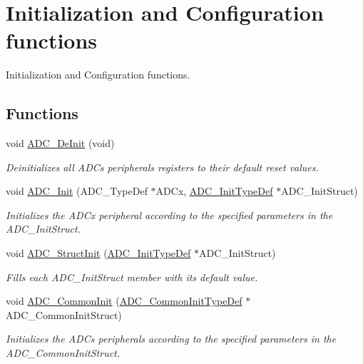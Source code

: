 \hypertarget{group___a_d_c___group1}{\section{Initialization and Configuration functions}
\label{group___a_d_c___group1}
}


Initialization and Configuration functions.  


\subsection*{Functions}
\begin{DoxyCompactItemize}
\item 
void \hyperlink{group___a_d_c___group1_ga1962afdd9eebe5c896bbba2e4f26fe09}{A\-D\-C\-\_\-\-De\-Init} (void)
\begin{DoxyCompactList}\small\item\em Deinitializes all A\-D\-Cs peripherals registers to their default reset values. \end{DoxyCompactList}\item 
void \hyperlink{group___a_d_c___group1_gabbab6038cf8691404350625e477254f9}{A\-D\-C\-\_\-\-Init} (A\-D\-C\-\_\-\-Type\-Def $\ast$A\-D\-Cx, \hyperlink{struct_a_d_c___init_type_def}{A\-D\-C\-\_\-\-Init\-Type\-Def} $\ast$A\-D\-C\-\_\-\-Init\-Struct)
\begin{DoxyCompactList}\small\item\em Initializes the A\-D\-Cx peripheral according to the specified parameters in the A\-D\-C\-\_\-\-Init\-Struct. \end{DoxyCompactList}\item 
void \hyperlink{group___a_d_c___group1_ga6c6e754d1d0a98d56e465efaf73272ec}{A\-D\-C\-\_\-\-Struct\-Init} (\hyperlink{struct_a_d_c___init_type_def}{A\-D\-C\-\_\-\-Init\-Type\-Def} $\ast$A\-D\-C\-\_\-\-Init\-Struct)
\begin{DoxyCompactList}\small\item\em Fills each A\-D\-C\-\_\-\-Init\-Struct member with its default value. \end{DoxyCompactList}\item 
void \hyperlink{group___a_d_c___group1_ga5803f6581a9cd7e90b6e637067102d94}{A\-D\-C\-\_\-\-Common\-Init} (\hyperlink{struct_a_d_c___common_init_type_def}{A\-D\-C\-\_\-\-Common\-Init\-Type\-Def} $\ast$A\-D\-C\-\_\-\-Common\-Init\-Struct)
\begin{DoxyCompactList}\small\item\em Initializes the A\-D\-Cs peripherals according to the specified parameters in the A\-D\-C\-\_\-\-Common\-Init\-Struct. \end{DoxyCompactList}\item 

\end{DoxyCompactItemize}
